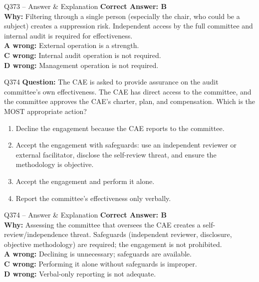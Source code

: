 \documentclass[aspectratio=169,10pt]{beamer}
\begin{document}
	\begin{frame}[t]{Q373 -- Answer \& Explanation}
		\small
		\textbf{Correct Answer: B} \\[4pt]
		\textbf{Why:} Filtering through a single person (especially the chair, who could be a subject) creates a suppression risk. Independent access by the full committee and internal audit is required for effectiveness. \\[4pt]
		\textbf{A wrong:} External operation is a strength. \\[2pt]
		\textbf{C wrong:} Internal audit operation is not required. \\[2pt]
		\textbf{D wrong:} Management operation is not required.
	\end{frame}
	
	\begin{frame}[t]{Q374}
		\small
		\textbf{Question:} The CAE is asked to provide assurance on the audit committee's own effectiveness. The CAE has direct access to the committee, and the committee approves the CAE's charter, plan, and compensation. Which is the MOST appropriate action?
		\begin{enumerate}[label=\Alph*.,itemsep=1pt,topsep=2pt]
			\item Decline the engagement because the CAE reports to the committee.
			\item Accept the engagement with safeguards: use an independent reviewer or external facilitator, disclose the self-review threat, and ensure the methodology is objective.
			\item Accept the engagement and perform it alone.
			\item Report the committee's effectiveness only verbally.
		\end{enumerate}
	\end{frame}
	
	\begin{frame}[t]{Q374 -- Answer \& Explanation}
		\small
		\textbf{Correct Answer: B} \\[4pt]
		\textbf{Why:} Assessing the committee that oversees the CAE creates a self-review/independence threat. Safeguards (independent reviewer, disclosure, objective methodology) are required; the engagement is not prohibited. \\[4pt]
		\textbf{A wrong:} Declining is unnecessary; safeguards are available. \\[2pt]
		\textbf{C wrong:} Performing it alone without safeguards is improper. \\[2pt]
		\textbf{D wrong:} Verbal-only reporting is not adequate.
	\end{frame}
	
\end{document}
